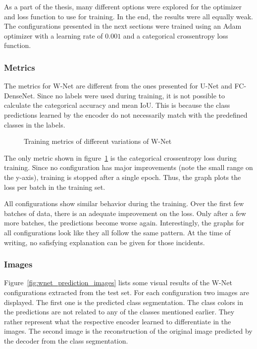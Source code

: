 As a part of the thesis, many different options were explored for the optimizer and loss function to use for training. In the end, the results were all equally weak. The configurations presented in the next sections were trained using an Adam optimizer with a learning rate of $0.001$ and a categorical crossentropy loss function.

\subsubsection{Metrics}
The metrics for W-Net are different from the ones presented for U-Net and FC-DenseNet. Since no labels were used during training, it is not possible to calculate the categorical accuracy and mean IoU. This is because the class predictions learned by the encoder do not necessarily match with the predefined classes in the labels.

\begin{figure}
    \centering
            
    \caption{Training metrics of different variations of W-Net}
    \label{fig:wnet_train_metrics}
\end{figure}

The only metric shown in figure~\ref{fig:wnet_train_metrics} is the categorical crossentropy loss during training. Since no configuration has major improvements (note the small range on the y-axis), training is stopped after a single epoch. Thus, the graph plots the loss per batch in the training set.

All configurations show similar behavior during the training. Over the first few batches of data, there is an adequate improvement on the loss. Only after a few more batches, the predictions become worse again. Interestingly, the graphs for all configurations look like they all follow the same pattern. At the time of writing, no safisfying explanation can be given for those incidents.

\subsubsection{Images}
Figure~\ref{fig:wnet_prediction_images} lists some visual results of the W-Net configurations extracted from the test set. For each configuration two images are displayed. The first one is the predicted class segmentation. The class colors in the predictions are not related to any of the classes mentioned earlier. They rather represent what the respective encoder learned to differentiate in the images. The second image is the reconstruction of the original image predicted by the decoder from the class segmentation.

